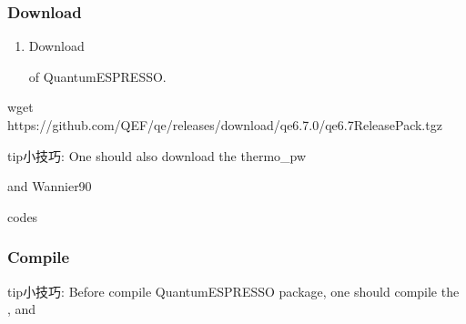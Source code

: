 \documentclass[a4paper,12pt,english]{sphinxmanual}
\begin{document}
\subsubsection{Download}
\label{\detokenize{compile/Quantum-ESPRESSO_6.7:download}}\begin{enumerate}
%
\item {} 
\sphinxAtStartPar
Download %
\begin{footnote}[16]\sphinxAtStartFootnote
{}
%
\end{footnote} of Quantum\sphinxhyphen{}ESPRESSO.

\end{enumerate}

\begin{sphinxVerbatim}[commandchars=\\\{\}]
wget https://github.com/QEF/q\PYGZhy{}e/releases/download/qe\PYGZhy{}6.7.0/qe\PYGZhy{}6.7\PYGZhy{}ReleasePack.tgz
\end{sphinxVerbatim}

\begin{sphinxadmonition}{tip}{小技巧:}
\sphinxAtStartPar
One should also download the thermo\_pw %
\begin{footnote}[17]\sphinxAtStartFootnote
{}
%
\end{footnote} and Wannier90 %
\begin{footnote}[18]\sphinxAtStartFootnote
{}
%
\end{footnote} codes
\end{sphinxadmonition}


\subsubsection{Compile}
\label{\detokenize{compile/Quantum-ESPRESSO_6.7:compile}}
\begin{sphinxadmonition}{tip}{小技巧:}
\sphinxAtStartPar
Before compile Quantum\sphinxhyphen{}ESPRESSO package, one should compile the {\hyperref[\detokenize{compile/libbeef::doc}]{}}, {\hyperref[\detokenize{compile/libxc_4.3.4::doc}]{}} and {\hyperref[\detokenize{compile/hdf5_1.12.0::doc}]{}}
\end{sphinxadmonition}
\end{document}
